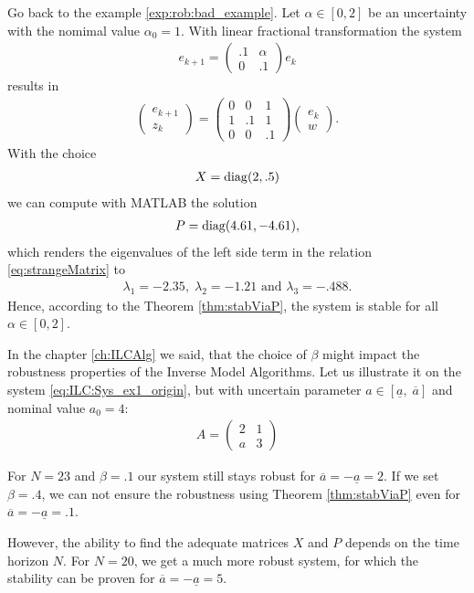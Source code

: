 Go back to the example \ref{exp:rob:bad_example}. 
Let $\alpha \in [0,2]$ be an uncertainty with the nomimal value $\alpha_0 = 1$.
With linear fractional transformation the system 
\begin{align}
e_{k+1} = \begin{pmatrix}
.1 & \alpha \\ 0 &.1
\end{pmatrix}e_k
\end{align}
results in 
\begin{align}
\begin{pmatrix}
e_{k+1} \\ z_k
\end{pmatrix} = 
\begin{pmatrix}
0 & 0 & 1 \\
1 & .1 & 1 \\
0 & 0 & .1
\end{pmatrix} \begin{pmatrix}
e_k \\ w
\end{pmatrix}. 
\end{align}
With the choice 
\begin{align}
X = \operatorname*{diag}(2, .5)
\end{align}
we can compute with MATLAB the solution 
\begin{align}
P = \operatorname*{diag}(4.61, -4.61), 
\end{align}
which renders the eigenvalues of the left side term in the relation \eqref{eq:strangeMatrix} to 
\begin{align}
\lambda_1 = -2.35, \; \lambda_2 = -1.21 \text{ and } \lambda_3 = -.488.
\end{align}
Hence, according to the Theorem \ref{thm:stabViaP}, the system is stable for all $\alpha \in [0,2]$. 

\begin{exam}
	\label{ex:Rob:robvsN}
	In the chapter \ref{ch:ILCAlg} we said, that the choice of $\beta$ might impact the robustness properties of the Inverse Model Algorithms.
	Let us illustrate it on the system \eqref{eq:ILC:Sys_ex1_origin}, but with uncertain parameter $a \in [\underline{a}, \; \overline{a}]$ and nominal value $a_0 = 4$: 
	\begin{align}
	A = \begin{pmatrix}
	2 & 1 \\  a & 3
	\end{pmatrix}
	\end{align}
			
	For $N = 23$ and $\beta = .1$ our system still stays robust for $\overline a = - \underline a = 2$. If we set $\beta = .4$, we can not ensure the robustness using Theorem \ref{thm:stabViaP} even for $\overline a = - \underline a = .1$. 
	
	However, the ability to find the adequate matrices $X$ and $P$ depends on the time horizon $N$. 
	For $N = 20$, we get a much more robust system, for which the stability can be proven for $\overline a = - \underline a = 5$. 
	

		
\end{exam}


